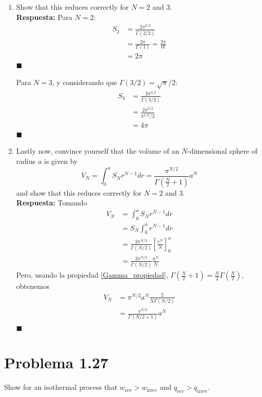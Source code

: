 \documentclass[]{article}
\numberwithin{equation}{section}
\newcommand{\0}{\textcolor{gray}{0}}
\newcommand{\qed}{\hfill\(\blacksquare\)}
\begin{document}
\begin{enumerate}
	\item[e.] Show that this reduces correctly for $N=2$ and 3.
	\\
	
	\textbf{Respuesta:}
	Para \(N=2\):
	\begin{align*}
		S_2 &= \frac{2 \pi^{2/2}}{\Gamma(2 / 2)}\\
		&= \frac{2\pi}{\Gamma(1)} = \frac{2\pi}{0!}\\
		&= 2\pi
	\end{align*}
	\qed
	
	Para \(N=3\), y considerando que \(\Gamma(3/2) = \sqrt{\pi}/2\):
	\begin{align*}
		S_3 &= \frac{2 \pi^{3/2}}{\Gamma(3 / 2)}\\
		&= \frac{2 \pi^{3/2}}{\pi^{1/2}/2}\\
		&= 4\pi
	\end{align*}
	\qed
	
	\item[f.] Lastly now, convince yourself that the volume of an $N$-dimensional sphere of radius $a$ is given by
	\begin{equation*}
		V_N = \int_0^a S_N r^{N-1} d r=\frac{\pi^{N / 2}}{\Gamma\left(\frac{N}{2}+1\right)} a^N
	\end{equation*}
	and show that this reduces correctly for $N=2$ and 3.
	\\
	
	\textbf{Respuesta:}
	Tomando
	\begin{align*}
		V_N &= \int_0^a S_N r^{N-1} d r\\
		&= S_N \int_0^a r^{N-1} d r\\
		&= \frac{2 \pi^{N/2}}{\Gamma(N / 2)} \left[\frac{r^N}{N} \right]^{a}_{0}\\
		&= \frac{2 \pi^{N/2}}{\Gamma(N / 2)} \frac{a^N}{N}
	\end{align*}
	Pero, usando la propiedad \ref{Gamma_propiedad}, \(\Gamma\left( \frac{N}{2} + 1\right) =  \frac{N}{2} \Gamma\left(\frac{N}{2}\right)\), obtenemos
	\begin{align*}
		V_N &=  \pi^{N/2}a^N\frac{2}{N\Gamma(N / 2)}\\
		&= \frac{\pi^{N/2}}{\Gamma(N / 2 + 1)}a^N
	\end{align*}
	\qed
\end{enumerate}

\section{Problema 1.27}
Show for an isothermal process that \(w_\text{rev} > w_\text{irrev}\) and \(q_\text{rev} > q_\text{irrev}\).
\\
\end{document}
